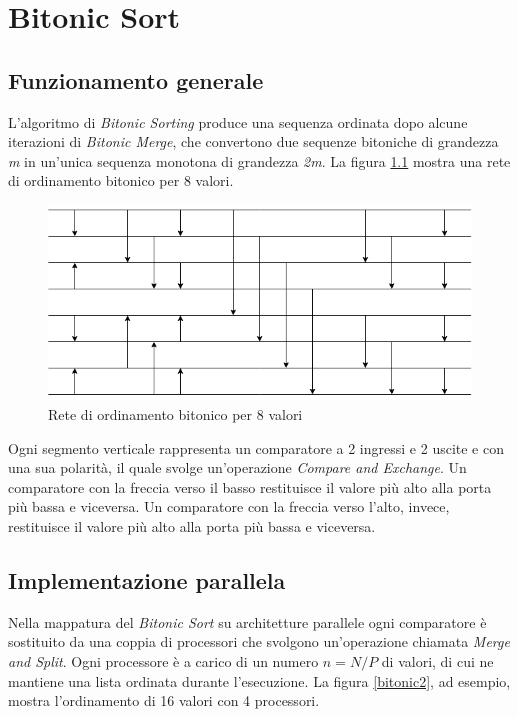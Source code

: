 \chapter{Bitonic Sort}

\section{Funzionamento generale}

L'algoritmo di \textit{Bitonic Sorting} produce una sequenza ordinata dopo alcune iterazioni di \textit{Bitonic Merge}, che convertono due sequenze bitoniche di grandezza \textit{m} in un'unica sequenza monotona di grandezza \textit{2m}.
La figura \ref{bitonic1} mostra una rete di ordinamento bitonico per 8 valori.

\begin{figure}[h!]
  \centering
  \includegraphics[width=\linewidth]{Images/bitonic1.png}
  \caption{Rete di ordinamento bitonico per 8 valori}
  \label{bitonic1}
\end{figure}

Ogni segmento verticale rappresenta un comparatore a 2 ingressi e 2 uscite e con una sua polarità, il quale svolge un'operazione \textit{Compare and Exchange}. Un comparatore con la freccia verso il basso restituisce il valore più alto alla porta più bassa e viceversa. Un comparatore con la freccia verso l'alto, invece, restituisce il valore più alto alla porta più bassa e viceversa.

\section{Implementazione parallela}

Nella mappatura del \textit{Bitonic Sort} su architetture parallele ogni comparatore è sostituito da una coppia di processori che svolgono un'operazione chiamata \textit{Merge and Split}. Ogni processore è a carico di un numero $n = N / P$ di valori, di cui ne mantiene una lista ordinata durante l'esecuzione. La figura \ref{bitonic2}, ad esempio, mostra l'ordinamento di 16 valori con 4 processori.

